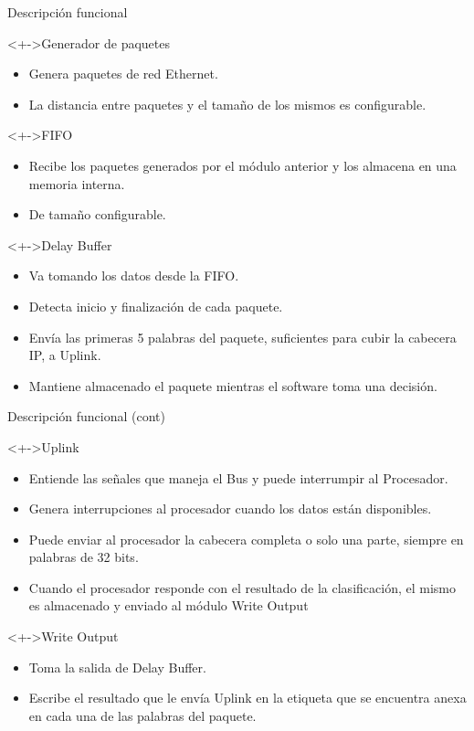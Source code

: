 \documentclass[xcolor=dvipsnames]{beamer}
\begin{document}
\begin{frame}{Descripción funcional}
\begin{block}<+->{Generador de paquetes}   
    \begin{itemize}
      \scriptsize
     	\item Genera paquetes de red Ethernet.
	\item La distancia entre paquetes y el tamaño de los mismos es configurable. 
    \end{itemize}
  \end{block}
\begin{block}<+->{FIFO}   
    \begin{itemize}
      \scriptsize
     	\item Recibe los paquetes generados por el módulo anterior y los almacena en una memoria interna.
	\item De tamaño configurable.
    \end{itemize}
  \end{block}
\begin{block}<+->{Delay Buffer}   
    \begin{itemize}
      \scriptsize
     	\item Va tomando los datos desde la FIFO.
	\item Detecta inicio y finalización de cada paquete.
	\item Envía las primeras 5 palabras del paquete, suficientes para cubir la cabecera IP, a Uplink.
	\item Mantiene almacenado el paquete mientras el software toma una decisión.
    \end{itemize}
  \end{block}
\end{frame}
\begin{frame}{Descripción funcional (cont)}
  \begin{block}<+->{Uplink}   
    \begin{itemize}
      \scriptsize
     	\item Entiende las señales que maneja el Bus y puede interrumpir al Procesador.
	\item Genera interrupciones al procesador cuando los datos están disponibles.
	\item Puede enviar al procesador la cabecera completa o solo una parte, siempre en palabras de 32 bits.
	\item Cuando el procesador responde con el resultado de la clasificación, el mismo es almacenado y enviado al módulo Write Output
    \end{itemize}
  \end{block}
\begin{block}<+->{Write Output}   
    \begin{itemize}
      \scriptsize
     	\item Toma la salida de Delay Buffer.
	\item Escribe el resultado que le envía Uplink en la etiqueta que se encuentra anexa en cada una de las palabras del paquete.
    \end{itemize}
  \end{block}
\end{frame}
\end{document}
